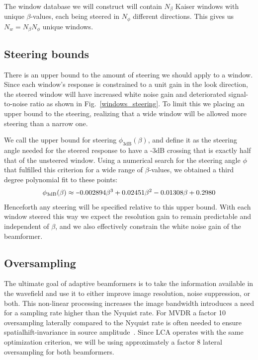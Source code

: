\documentclass[10pt,journal,draftclsnofoot,onecolumn]{IEEEtran}
\newcommand\Fig[1]{Fig.~\ref{#1}}
\newcommand\1{\vec 1}
\newcommand\minus{\scalebox{0.75}[1.0]{$-$}}
\begin{document}
The window database we will construct will contain $N_\beta$ Kaiser windows with unique $\beta$-values, each being steered in $N_\phi$ different directions. This gives us $N_w = N_\beta N_\phi$ unique windows.


\subsection{Steering bounds}

There is an upper bound to the amount of steering we should apply to a window. Since each window's response is constrained to a unit gain in the look direction, the steered window will have increased white noise gain and deteriorated signal-to-noise ratio as shown in \Fig{windows_steering}. To limit this we placing an upper bound to the steering, realizing that  a wide window will be allowed more steering than a narrow one.

We call the upper bound for steering $\phi_{\text{3dB}}(\beta)$, and define it as the steering angle needed for the steered response to have a -3dB crossing that is exactly half that of the unsteered window. Using a numerical search for the steering angle $\phi$ that fulfilled this criterion for a wide range of $\beta$-values, we obtained a third degree polynomial fit to these points:
%
\begin{align}
\phi_\text{3dB}(\beta) \approx \minus{}0.002894\beta^3 + 0.02451\beta^2 - 0.01308\beta + 0.2980
\end{align}
%
Henceforth any steering will be specified relative to this upper bound. With each window steered this way we expect the resolution gain to remain predictable and independent of $\beta$, and we also effectively constrain the white noise gain of the beamformer.


\subsection{Oversampling}

The ultimate goal of adaptive beamformers is to take the information available in the wavefield and use it to either improve image resolution, noise suppression, or both. This non-linear processing increases the image bandwidth introduces a need for a sampling rate higher than the Nyquist rate. For MVDR a factor 10 oversampling laterally compared to the Nyquist rate is often needed to ensure  spatialhift-invariance in source amplitude~\cite{Asen2014}. Since LCA operates with the same optimization criterion, we will be using approximately a factor 8 lateral oversampling for both beamformers. 
\end{document}
